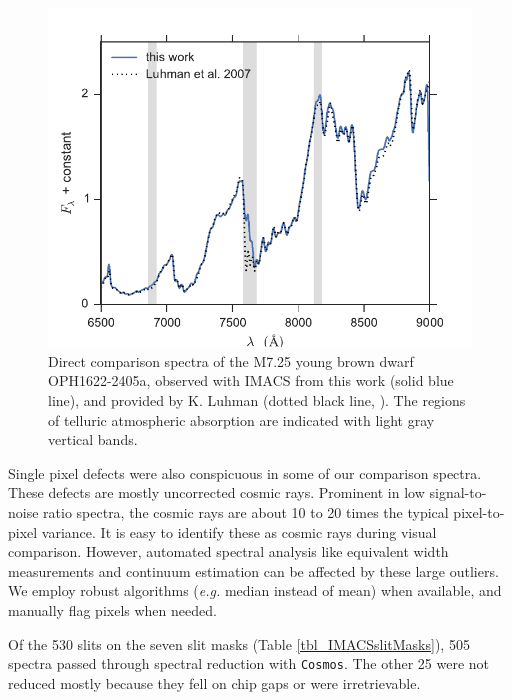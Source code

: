 \begin{figure}[ht!]
\caption[Comparison of IMACS spectroscopy to a previously published spectrum of the same source]{Direct comparison spectra of the M7.25 young brown dwarf OPH1622-2405a, observed with IMACS from this work (solid blue line), and provided by K. Luhman (dotted black line, \citet{2007ApJ...659.1629L}).  The regions of telluric atmospheric absorption are indicated with light gray vertical bands.  \label{fig_oph1622_compare}}
\centering
\includegraphics[scale=0.9]{chIMACS/figures/oph1622-2405a_compare}
\end{figure}

Single pixel defects were also conspicuous in some of our comparison spectra.  These defects are mostly uncorrected cosmic rays.  Prominent in low signal-to-noise ratio spectra, the cosmic rays are about 10 to 20 times the typical pixel-to-pixel variance.  It is easy to identify these as cosmic rays during visual comparison.  However, automated spectral analysis like equivalent width measurements and continuum estimation can be affected by these large outliers.  We employ robust algorithms (\emph{e.g.} median instead of mean) when available, and manually flag pixels when needed.

Of the 530 slits on the seven slit masks (Table \ref{tbl_IMACSslitMasks}), 505 spectra passed through spectral reduction with \texttt{Cosmos}.  The other 25 were not reduced mostly because they fell on chip gaps or were irretrievable.

